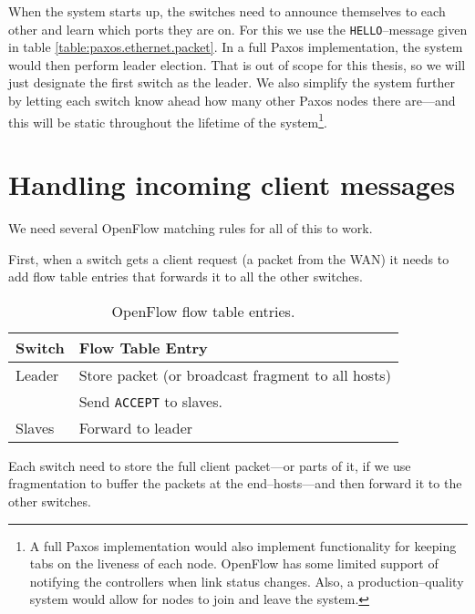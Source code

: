 When the system starts up, the switches need to announce themselves to each
other and learn which ports they are on.  For this we use the
\texttt{HELLO}--message given in table \ref{table:paxos.ethernet.packet}.
In a full Paxos implementation, the system would then perform leader
election.  That is out of scope for this thesis, so we will just designate
the first switch as the leader.  We also simplify the system further by
letting each switch know ahead how many other Paxos nodes there are---and
this will be static throughout the lifetime of the system\footnote{A full
Paxos implementation would also implement functionality for keeping tabs
on the liveness of each node.  OpenFlow has some limited support of
notifying the controllers when link status changes.  Also, a
production--quality system would allow for nodes to join and leave the
system.}.

\section{Handling incoming client messages}
\label{chapter:incoming.client}

We need several OpenFlow matching rules for all of this to work.

First, when a switch gets a client request (a packet from the WAN) it needs
to add flow table entries that forwards it to all the other switches.

\begin{table}[H]
  \centering
  \begin{tabular}{|l|l|}
    \hline
      \textbf{Switch} &
      \textbf{Flow Table Entry} \\

    \hline
      Leader & Store packet (or broadcast fragment to all hosts) \\
             & Send \texttt{ACCEPT} to slaves. \\

    \hline
      Slaves & Forward to leader \\

    \hline
  \end{tabular}

  \caption{OpenFlow flow table entries.}
  \label{table:paxos.flowtable.entries}
\end{table}

Each switch need to store the full client packet---or parts of it, if we
use fragmentation to buffer the packets at the end--hosts---and then forward
it to the other switches.

